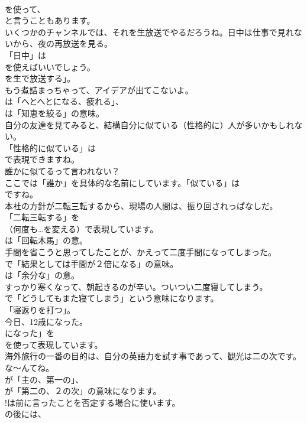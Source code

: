 \documentclass[8pt]{extreport}
\begin{document}
\begin{CJK}{UTF8}{min}
\\	を使って、
\\	と言うこともあります。	
\\	いくつかのチャンネルでは、それを生放送でやるだろうね。日中は仕事で見れないから、夜の再放送を見る。 
\\	「日中」は
\\	を使えばいいでしょう。
\\	を生で放送する」。	
\\	もう煮詰まっちゃって、アイデアが出てこないよ。 
\\	は「へとへとになる、疲れる」、
\\	は「知恵を絞る」の意味。	
\\	自分の友達を見てみると、結構自分に似ている（性格的に）人が多いかもしれない。 
\\	「性格的に似ている」は
\\	で表現できますね。	
\\	誰かに似てるって言われない？ 
\\	ここでは「誰か」を具体的な名前にしています。「似ている」は
\\	ですね。	
\\	本社の方針が二転三転するから、現場の人間は、振り回されっぱなしだ。 
\\	「二転三転する」を
\\	（何度も…を変える）で表現しています。
\\	は「回転木馬」の意。	
\\	手間を省こうと思ってしたことが、かえって二度手間になってしまった。 
\\	で「結果としては手間が２倍になる」の意味。
\\	は「余分な」の意。	
\\	すっかり寒くなって、朝起きるのが辛い。ついつい二度寝してしまう。 
\\	で「どうしてもまた寝てしまう」という意味になります。
\\	「寝返りを打つ」。	
\\	今日、12歳になった。 
\\	になった」を
\\	を使って表現しています。	
\\	海外旅行の一番の目的は、自分の英語力を試す事であって、観光は二の次です。な～んてね。 
\\	が「主の、第一の」、
\\	が「第二の、２の次」の意味になります。
\\	!は前に言ったことを否定する場合に使います。
\\	の後には、

\end{CJK}
\end{document}
